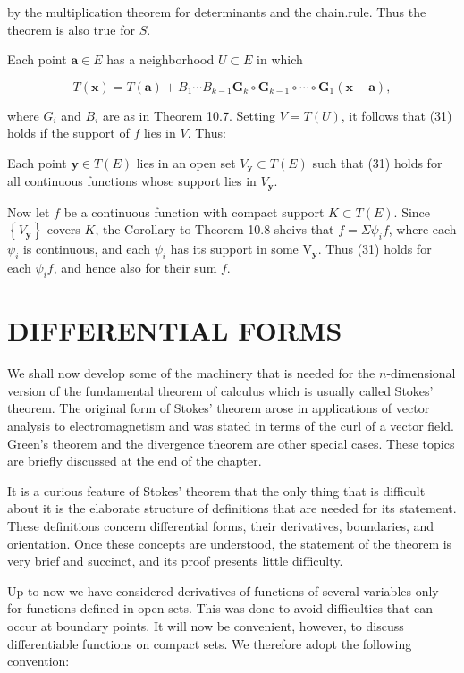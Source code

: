 \documentclass[10pt]{article}
\begin{document}
by the multiplication theorem for determinants and the chain.rule. Thus the theorem is also true for $S$.

Each point $\mathbf{a} \in E$ has a neighborhood $U \subset E$ in which

$$
T(\mathbf{x})=T(\mathbf{a})+B_{1} \cdots B_{k-1} \mathbf{G}_{k} \circ \mathbf{G}_{k-1} \circ \cdots \circ \mathbf{G}_{1}(\mathbf{x}-\mathbf{a}),
$$

where $G_{i}$ and $B_{i}$ are as in Theorem 10.7. Setting $V=T(U)$, it follows that (31) holds if the support of $f$ lies in $V$. Thus:

Each point $\mathbf{y} \in T(E)$ lies in an open set $V_{\mathbf{y}} \subset T(E)$ such that (31) holds for all continuous functions whose support lies in $V_{\mathbf{y}}$.

Now let $f$ be a continuous function with compact support $K \subset T(E)$. Since $\left\{V_{\mathbf{y}}\right\}$ covers $K$, the Corollary to Theorem 10.8 shcivs that $f=\Sigma \psi_{i} f$, where each $\psi_{i}$ is continuous, and each $\psi_{i}$ has its support in some $\mathrm{V}_{\mathbf{y}}$. Thus (31) holds for each $\psi_{i} f$, and hence also for their sum $f$.

\section{DIFFERENTIAL FORMS}
We shall now develop some of the machinery that is needed for the $n$-dimensional version of the fundamental theorem of calculus which is usually called Stokes' theorem. The original form of Stokes' theorem arose in applications of vector analysis to electromagnetism and was stated in terms of the curl of a vector field. Green's theorem and the divergence theorem are other special cases. These topics are briefly discussed at the end of the chapter.

It is a curious feature of Stokes' theorem that the only thing that is difficult about it is the elaborate structure of definitions that are needed for its statement. These definitions concern differential forms, their derivatives, boundaries, and orientation. Once these concepts are understood, the statement of the theorem is very brief and succinct, and its proof presents little difficulty.

$\mathrm{Up}$ to now we have considered derivatives of functions of several variables only for functions defined in open sets. This was done to avoid difficulties that can occur at boundary points. It will now be convenient, however, to discuss differentiable functions on compact sets. We therefore adopt the following convention:
\end{document}
